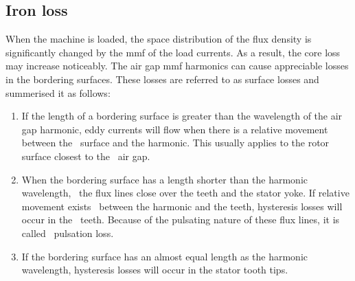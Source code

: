 \subsection{Iron loss}\label{subsec:iron_loss}
When the machine is loaded, the space distribution of the flux density is significantly changed by the mmf of the load currents. As a result, the core loss may increase noticeably. The air gap mmf harmonics can cause appreciable losses in the bordering surfaces. These losses are referred to as surface losses and \cite{Vogt1996} summerised it as follows:
\begin{enumerate}
	\item If the length of a bordering surface is greater than the wavelength of the air~%
	gap harmonic, eddy currents will flow when there is a relative movement between the~%
	surface and the harmonic. This usually applies to the rotor surface closest to the~%
	air gap.
	\item When the bordering surface has a length shorter than the harmonic wavelength,~%
	the flux lines close over the teeth and the stator yoke. If relative movement exists~%
	between the harmonic and the teeth, hysteresis losses will occur in the~%
	teeth. Because of the pulsating nature of these flux lines, it is called~%
	pulsation loss.
	\item If the bordering surface has an almost equal length as the harmonic~%
	wavelength, hysteresis losses will occur in the stator tooth tips. 
\end{enumerate}

